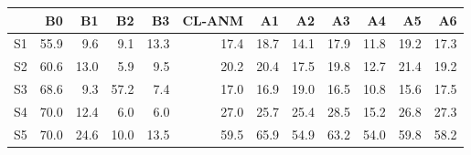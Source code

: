 \begin{tabular}{lrrrrrrrrrrr}
\toprule
 & B0 & B1 & B2 & B3 & CL-ANM & A1 & A2 & A3 & A4 & A5 & A6 \\
\midrule
S1 & 55.9 & 9.6 & 9.1 & 13.3 & 17.4 & 18.7 & 14.1 & 17.9 & 11.8 & 19.2 & 17.3 \\
S2 & 60.6 & 13.0 & 5.9 & 9.5 & 20.2 & 20.4 & 17.5 & 19.8 & 12.7 & 21.4 & 19.2 \\
S3 & 68.6 & 9.3 & 57.2 & 7.4 & 17.0 & 16.9 & 19.0 & 16.5 & 10.8 & 15.6 & 17.5 \\
S4 & 70.0 & 12.4 & 6.0 & 6.0 & 27.0 & 25.7 & 25.4 & 28.5 & 15.2 & 26.8 & 27.3 \\
S5 & 70.0 & 24.6 & 10.0 & 13.5 & 59.5 & 65.9 & 54.9 & 63.2 & 54.0 & 59.8 & 58.2 \\
\bottomrule
\end{tabular}
